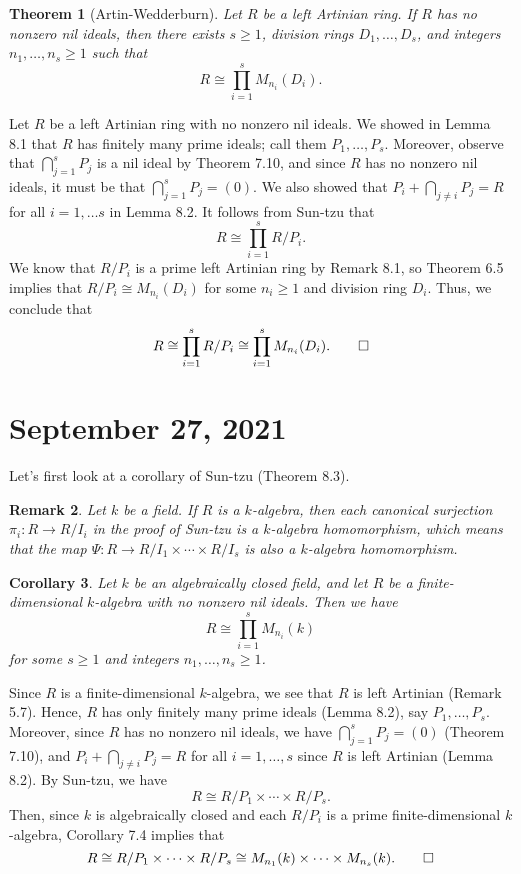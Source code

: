 \documentclass[10pt]{article}
\makeatletter
\numberwithin{equation}{section}
\theoremstyle{newstyle}
\newtheorem{thm}{Theorem}[section]
\newtheorem{cor}[thm]{Corollary}
\newtheorem{remark}[thm]{Remark}
\newenvironment{pf}[1][\proofname]{\par
  \pushQED{\qed}%
  \normalfont \topsep0\p@\relax
  \trivlist
  \item[\hskip\labelsep\scshape
  #1\@addpunct{.}]\ignorespaces
}{%
  \popQED\endtrivlist\@endpefalse
}
\makeatother
\begin{document}
\begin{thm}[Artin-Wedderburn]
Let $R$ be a left Artinian ring. If $R$ has no nonzero nil ideals, then there exists $s \geq 1$, 
division rings $D_1, \dots, D_s$, and integers $n_1, \dots, n_s \geq 1$ such that 
\[ R \cong \prod_{i=1}^s M_{n_i}(D_i). \]
\end{thm}
\begin{pf}
Let $R$ be a left Artinian ring with no nonzero nil ideals. We showed in Lemma 8.1 that $R$ 
has finitely many prime ideals; call them $P_1, \dots, P_s$. Moreover, observe that $\bigcap_{j=1}^s P_j$ is a nil ideal by Theorem 7.10, and since $R$ has no nonzero nil ideals, it must be that 
$\bigcap_{j=1}^s P_j = (0)$. We also showed that $P_i + \bigcap_{j\neq i} P_j = R$ for all 
$i = 1, \dots s$ in Lemma 8.2. It follows from Sun-tzu that 
\[ R \cong \prod_{i=1}^s R/P_i. \] 
We know that $R/P_i$ is a prime left Artinian ring by Remark 8.1, so Theorem 6.5 implies that 
$R/P_i \cong M_{n_i}(D_i)$ for some $n_i \geq 1$ and division ring $D_i$. Thus, we conclude that 
\[ R \cong \prod_{i=1}^s R/P_i \cong \prod_{i=1}^s M_{n_i}(D_i). \qedhere \]
\end{pf}

\section{September 27, 2021}

Let's first look at a corollary of Sun-tzu (Theorem 8.3).

\begin{remark}
Let $k$ be a field. If $R$ is a $k$-algebra, then each canonical surjection $\pi_i : R \to R/I_i$ 
in the proof of Sun-tzu is a $k$-algebra homomorphism, which means that the map
$\Psi : R \to R/I_1 \times \cdots \times R/I_s$ is also a $k$-algebra homomorphism. 
\end{remark}

\begin{cor}
Let $k$ be an algebraically closed field, and let $R$ be a finite-dimensional $k$-algebra with no nonzero
nil ideals. Then we have 
\[ R \cong \prod_{i=1}^s M_{n_i}(k) \]
for some $s \geq 1$ and integers $n_1, \dots, n_s \geq 1$. 
\end{cor}
\begin{pf}
Since $R$ is a finite-dimensional $k$-algebra, we see that $R$ is left Artinian (Remark 5.7).
Hence, $R$ has only finitely many prime ideals (Lemma 8.2), say $P_1, \dots, P_s$. Moreover, 
since $R$ has no nonzero nil ideals, we have $\bigcap_{j=1}^s P_j = (0)$ (Theorem 7.10), and 
$P_i + \bigcap_{j\neq i} P_j = R$ for all $i = 1, \dots, s$ since $R$ is left Artinian (Lemma 8.2). 
By Sun-tzu, we have 
\[ R \cong R/P_1 \times \cdots \times R/P_s. \]
Then, since $k$ is algebraically closed and each $R/P_i$ is a prime finite-dimensional $k$-algebra, 
Corollary 7.4 implies that 
\[ R \cong R/P_1 \times \cdots \times R/P_s \cong M_{n_1}(k) \times \cdots \times M_{n_s}(k). 
\qedhere \]
\end{pf}
\end{document}
